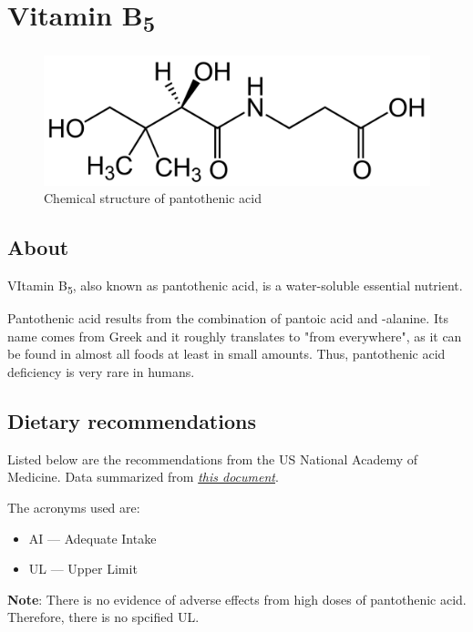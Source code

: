 \documentclass{book}
\begin{document}
\chapter{Vitamin B\textsubscript{5}}
\begin{figure}[h]
	\caption{Chemical structure of pantothenic acid}
	\centering \includegraphics[width=\textwidth]{images/Vitamin_B5_chemical_structure}
\end{figure}
\newpage

\section{About}
VItamin B\textsubscript{5}, also known as pantothenic acid, is a water-soluble essential nutrient.

Pantothenic acid results from the combination of pantoic acid and \textbeta-alanine. Its name comes from Greek and it roughly translates to "from everywhere", as it can be found in almost all foods at least in small amounts. Thus, pantothenic acid deficiency is very rare in humans.

\section{Dietary recommendations}
Listed below are the recommendations from the US National Academy of Medicine. Data summarized from \href{https://nap.nationalacademies.org/read/6015/chapter/12}{\textit{this document}}.

The acronyms used are:
\begin{itemize}
	\item AI --- Adequate Intake
	\item UL --- Upper Limit
\end{itemize}

\textbf{Note}: There is no evidence of adverse effects from high doses of pantothenic acid. Therefore, there is no spcified UL.
\end{document}
